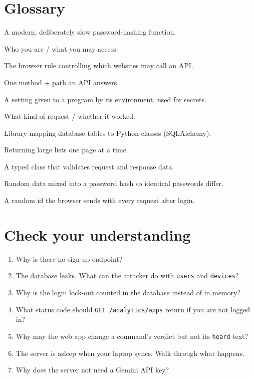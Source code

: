 \documentclass[11pt,a4paper]{article}
\begin{document}
\section{Glossary}
\begin{description}[style=nextline,leftmargin=1.2cm,itemsep=2pt]
  \item[Argon2] A modern, deliberately slow password-hashing function.
  \item[Authentication / authorisation] Who you are / what you may access.
  \item[CORS] The browser rule controlling which websites may call an API.
  \item[Endpoint] One method + path an API answers.
  \item[Environment variable] A setting given to a program by its environment, used for secrets.
  \item[HTTP method / status code] What kind of request / whether it worked.
  \item[ORM] Library mapping database tables to Python classes (SQLAlchemy).
  \item[Pagination] Returning large lists one page at a time.
  \item[Pydantic model] A typed class that validates request and response data.
  \item[Salt] Random data mixed into a password hash so identical passwords differ.
  \item[Session cookie] A random id the browser sends with every request after login.
\end{description}

\section{Check your understanding}
\begin{exercise}
\begin{enumerate}
  \item Why is there no sign-up endpoint?
  \item The database leaks. What can the attacker do with \texttt{users} and \texttt{devices}?
  \item Why is the login lock-out counted in the database instead of in memory?
  \item What status code should \texttt{GET /analytics/apps} return if you are not logged in?
  \item Why may the web app change a command's verdict but not its \texttt{heard} text?
  \item The server is asleep when your laptop syncs. Walk through what happens.
  \item Why does the server not need a Gemini API key?
\end{enumerate}
\end{exercise}
\end{document}
